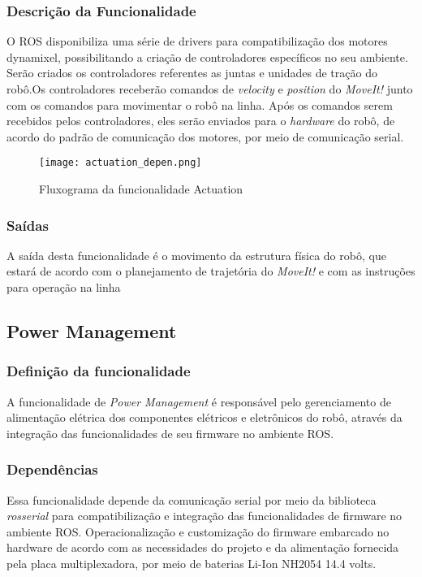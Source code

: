 \subsubsection{Descrição da Funcionalidade}
O ROS disponibiliza uma série de drivers para compatibilização dos motores dynamixel, possibilitando a criação de controladores específicos no seu ambiente. Serão criados os controladores referentes as juntas e unidades de tração do robô.Os controladores receberão comandos de \textit{velocity} e \textit{position} do \textit{MoveIt!} junto com os comandos para movimentar o robô na linha.
Após os comandos serem recebidos pelos controladores, eles serão enviados para o \textit{hardware} do robô, de acordo do padrão de comunicação dos motores, por meio de comunicação serial. 
\begin{figure}[h]
	\centering
	\texttt{[image: actuation\_depen.png]}
	\caption{Fluxograma da funcionalidade Actuation}
	\label{fig:depen_actuation}
\end{figure}
\subsubsection{Saídas}
A saída desta funcionalidade é o movimento da estrutura física do robô, que estará de acordo com o planejamento de trajetória do \textit{MoveIt!} e com as instruções para operação na linha

\subsection{Power Management}
\label{ssec:power}
\subsubsection{Definição da funcionalidade}

A funcionalidade de \textit{Power Management} é responsável pelo gerenciamento de alimentação elétrica dos componentes elétricos e eletrônicos do robô, através da integração das funcionalidades de seu firmware no ambiente ROS.
\subsubsection{Dependências}
Essa funcionalidade depende da comunicação serial por meio da biblioteca \textit{rosserial} para compatibilização e integração das funcionalidades de firmware no ambiente ROS. Operacionalização e customização do firmware embarcado no hardware de acordo com as necessidades do projeto e da alimentação fornecida pela placa multiplexadora, por meio de baterias Li-Ion NH2054 14.4 volts.

